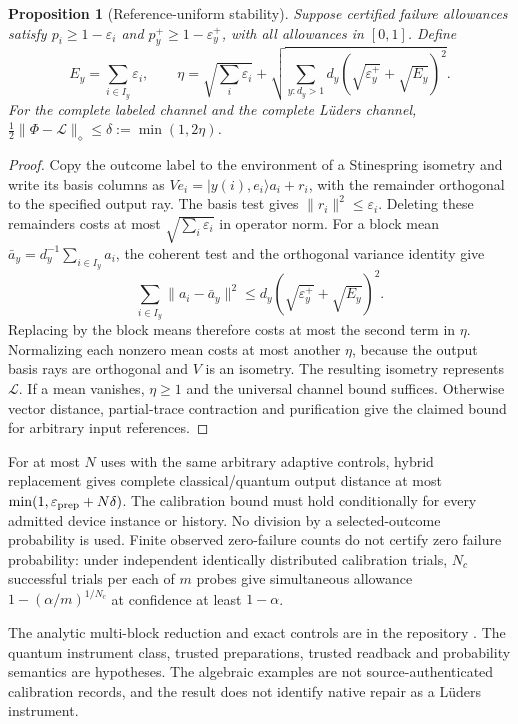 \documentclass[11pt]{article}
\renewcommand{\_}{\textunderscore\allowbreak}
\newtheorem{proposition}{Proposition}
\theoremstyle{remark}
\begin{document}
\pagebreak
\begin{proposition}[Reference-uniform stability]
Suppose certified failure allowances satisfy
$p_i\ge1-\varepsilon_i$ and $p_y^+\ge1-\varepsilon_y^+$, with all
allowances in $[0,1]$. Define
\[
 E_y=\sum_{i\in I_y}\varepsilon_i,\qquad
 \eta=\sqrt{\sum_i\varepsilon_i}
 +\sqrt{\sum_{y:d_y>1}d_y
       (\sqrt{\varepsilon_y^+}+\sqrt{E_y})^2}.
\]
For the complete labeled channel and the complete L\"uders channel,
$\tfrac12\|\Phi-\mathcal L\|_\diamond\le\delta:=\min(1,2\eta)$.
\end{proposition}
\begin{proof}
Copy the outcome label to the environment of a Stinespring isometry and
write its basis columns as
$Ve_i=|y(i),e_i\rangle a_i+r_i$, with the remainder orthogonal to the
specified output ray. The basis test gives $\|r_i\|^2\le\varepsilon_i$.
Deleting these remainders costs at most $\sqrt{\sum_i\varepsilon_i}$
in operator norm. For a block mean $\bar a_y=d_y^{-1}\sum_{i\in I_y}a_i$,
the coherent test and the orthogonal variance identity give
\[
 \sum_{i\in I_y}\|a_i-\bar a_y\|^2
 \le d_y(\sqrt{\varepsilon_y^+}+\sqrt{E_y})^2.
\]
Replacing by the block means therefore costs at most the second term
in $\eta$. Normalizing each nonzero mean costs at most another $\eta$,
because the output basis rays are orthogonal and $V$ is an isometry.
The resulting isometry represents $\mathcal L$. If a mean vanishes,
$\eta\ge1$ and the universal channel bound suffices. Otherwise vector
distance, partial-trace contraction and purification give the claimed
bound for arbitrary input references.
\end{proof}

For at most $N$ uses with the same arbitrary adaptive controls, hybrid
replacement gives complete classical/quantum output distance at most
$\min(1,\varepsilon_{\rm prep}+N\delta)$. The calibration bound must
hold conditionally for every admitted device instance or history. No
division by a selected-outcome probability is used. Finite observed
zero-failure counts do not certify zero failure probability: under
independent identically distributed calibration trials, $N_c$ successful
trials per each of $m$ probes give simultaneous allowance
$1-(\alpha/m)^{1/N_c}$ at confidence at least $1-\alpha$.

The analytic multi-block reduction and exact controls are in the repository
\cite{observerPatchHolographyRepo}. The quantum instrument class, trusted
preparations, trusted readback and probability semantics are hypotheses.
The algebraic examples are not source-authenticated calibration records,
and the result does not identify native repair as a L\"uders instrument.
\end{document}
